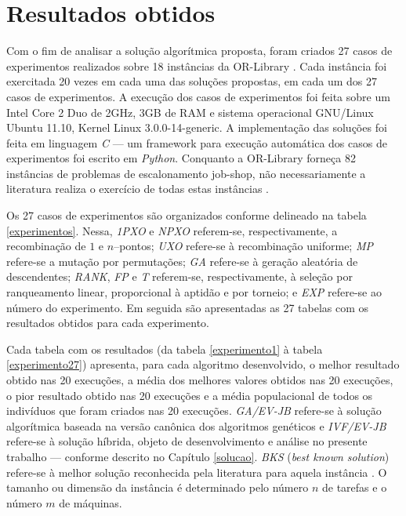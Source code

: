 \documentclass[relatorio,nocolorlinks]{inf-ufg}
\begin{document}
\chapter{Resultados obtidos}
\label{resultados}

Com o fim de analisar a solu\c{c}\~{a}o algor\'{i}tmica proposta, foram criados 27 casos de experimentos realizados sobre 18 inst\^{a}ncias
da OR-Library \cite{OrLibrary}. Cada inst\^{a}ncia foi exercitada 20 vezes em cada uma das solu\c{c}\~{o}es propostas, em cada um dos 27
casos de experimentos. A execu\c{c}\~{a}o dos casos de experimentos foi feita sobre um Intel Core 2 Duo de 2GHz, 3GB de RAM e sistema
operacional GNU/Linux Ubuntu 11.10, Kernel Linux 3.0.0-14-generic. A implementa\c{c}\~{a}o das solu\c{c}\~{o}es foi feita em linguagem
\textit{C} --- um framework para execu\c{c}\~{a}o autom\'{a}tica dos casos de experimentos foi escrito em \textit{Python}. Conquanto a
OR-Library forne\c{c}a 82 inst\^{a}ncias de problemas de escalonamento job-shop, n\~{a}o necessariamente a literatura realiza o exerc\'{i}cio
de todas estas inst\^{a}ncias \cite{Goncalves2002} \cite{Lin2010} \cite{Gao2011} \cite{Rego2009}.

Os 27 casos de experimentos s\~{a}o organizados conforme delineado na tabela \ref{experimentos}. Nessa, \textit{1PXO} e \textit{NPXO}
referem-se, respectivamente, a recombina\c{c}\~{a}o de $1$ e $n$--pontos; \textit{UXO} refere-se \`{a} recombina\c{c}\~{a}o uniforme;
\textit{MP} refere-se a muta\c{c}\~{a}o por permuta\c{c}\~{o}es; \textit{GA} refere-se \`{a} gera\c{c}\~{a}o aleat\'{o}ria de descendentes;
\textit{RANK}, \textit{FP} e \textit{T} referem-se, respectivamente, \`{a} sele\c{c}\~{a}o por ranqueamento linear, proporcional \`{a}
aptid\~{a}o e por torneio; e \textit{EXP} refere-se ao n\'{u}mero do experimento. Em seguida s\~{a}o apresentadas as 27 tabelas com os
resultados obtidos para cada experimento.

Cada tabela com os resultados (da tabela \ref{experimento1} \`{a} tabela \ref{experimento27}) apresenta, para cada algoritmo desenvolvido,
o melhor resultado obtido nas 20 execu\c{c}\~{o}es, a m\'{e}dia dos melhores valores obtidos nas 20 execu\c{c}\~{o}es, o pior resultado
obtido nas 20 execu\c{c}\~{o}es e a m\'{e}dia populacional de todos os indiv\'{i}duos que foram criados nas 20 execu\c{c}\~{o}es.
\textit{GA/EV-JB} refere-se \`{a} solu\c{c}\~{a}o algor\'{i}tmica baseada na vers\~{a}o can\^{o}nica dos algoritmos gen\'{e}ticos e
\textit{IVF/EV-JB} refere-se \`{a} solu\c{c}\~{a}o h\'{i}brida, objeto de desenvolvimento e an\'{a}lise no presente trabalho --- conforme
descrito no Cap\'{i}tulo \ref{solucao}. \textit{BKS} (\textit{best known solution}) refere-se \`{a} melhor solu\c{c}\~{a}o reconhecida pela
literatura para aquela inst\^{a}ncia \cite{Gao2011} \cite{Lin2010} \cite{Goncalves2002}. O tamanho ou dimens\~{a}o da inst\^{a}ncia \'{e}
determinado pelo n\'{u}mero $n$ de tarefas e o n\'{u}mero $m$ de m\'{a}quinas.
\end{document}
